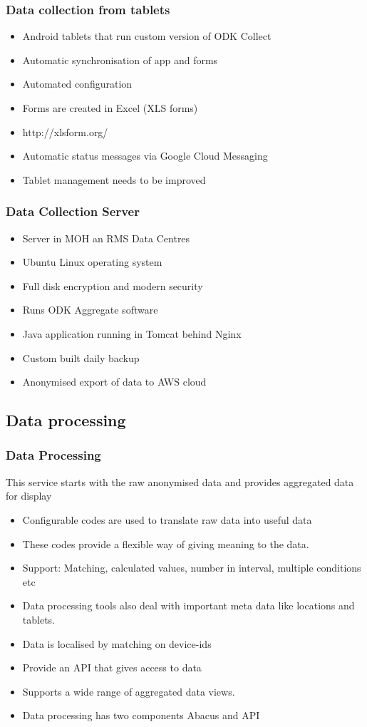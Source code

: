 \documentclass{beamer}
\begin{document}
\begin{frame}
  \frametitle{Data collection from tablets}
  \begin{itemize}
  \item Android tablets that run custom version of ODK Collect
  \item Automatic synchronisation of app and forms
  \item Automated configuration
  \item Forms are created in Excel (XLS forms)
  \item http://xlsform.org/
  \item Automatic status messages via Google Cloud Messaging
  \item Tablet management needs to be improved
  \end{itemize}
\end{frame}
\begin{frame}
  \frametitle{Data Collection Server}
  \begin{itemize}
  \item Server in MOH an RMS Data Centres
  \item Ubuntu Linux operating system
  \item Full disk encryption and modern security
  \item Runs ODK Aggregate software
  \item Java application running in Tomcat behind Nginx
  \item Custom built daily backup
  \item Anonymised export of data to AWS cloud
  \end{itemize}
\end{frame}

\subsection{Data processing}
\begin{frame}
  \frametitle{Data Processing}
  This service starts with the raw anonymised data and provides aggregated data for display
  \begin{itemize}
  \item Configurable codes are used to translate raw data into useful data
  \item These codes provide a flexible way of giving meaning to the data.
  \item Support: Matching, calculated values, number in interval, multiple conditions etc
  \item Data processing tools also deal with important meta data like locations and tablets.
  \item Data is localised by matching on device-ids
  \item Provide an API that gives access to data
  \item Supports a wide range of aggregated data views.
  \item Data processing has two components Abacus and API
  \end{itemize}
\end{frame}
\end{document}

